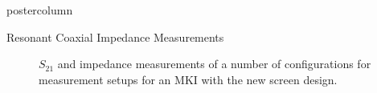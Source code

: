 \documentclass[final,hyperref={pdfpagelabels=false}]{beamer}
\begin{document}
\begin{frame}
\begin{columns}
\begin{column}{.49\textwidth}
\begin{beamercolorbox}[center,wd=\textwidth]{postercolumn}
\begin{minipage}[T]{.95\textwidth}
{\begin{block}{Resonant Coaxial Impedance Measurements}
\begin{figure}
{\label{fig:s21Res}
}
\caption{ $S_{21}$ and  impedance measurements of a number of configurations for measurement setups for an MKI with the new screen design.}
\end{figure}
\end{block}

}
\end{minipage}
\end{beamercolorbox}
\end{column}
\end{columns}
\end{frame}
\end{document}
